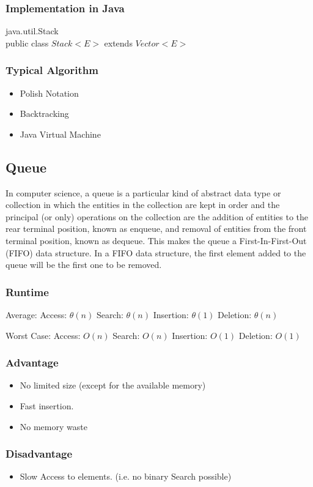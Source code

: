 \documentclass[12pt,a4paper]{article}
\newcommand{\RuntimeHead}{Runtime}
\newcommand{\AdvantageHead}{Advantage}
\newcommand{\DisadvantageHead}{Disadvantage}
\newcommand{\ImplementationInJavaHead}{Implementation in Java}
\newcommand{\TypicalAlgorithmHead}{Typical Algorithm}
\begin{document}
\subsubsection{\ImplementationInJavaHead}
java.util.Stack \\
public class $Stack<E>$
extends $Vector<E>$
\subsubsection{\TypicalAlgorithmHead}
\begin{itemize}
\item Polish Notation
\item Backtracking
\item Java Virtual Machine
\end{itemize}



\subsection{Queue}
In computer science, a queue is a particular kind of abstract data type or collection in which the entities in the collection are kept in order and the principal (or only) operations on the collection are the addition of entities to the rear terminal position, known as enqueue, and removal of entities from the front terminal position, known as dequeue. This makes the queue a First-In-First-Out (FIFO) data structure. In a FIFO data structure, the first element added to the queue will be the first one to be removed.
\subsubsection{\RuntimeHead}
Average: 
Access: $\theta(n)  $
Search: $\theta(n) $
Insertion: $ \theta(1)$ 
Deletion: $\theta (n)$ 

Worst Case: 
Access: $O(n)$  
Search: $O(n) $
Insertion: $O(1)$ 
Deletion: $O(1)$ 

\subsubsection{\AdvantageHead}
\begin{itemize}
\item No limited size (except for the available memory)
\item Fast insertion. 
\item No memory waste
\end{itemize}
\subsubsection{\DisadvantageHead}
\begin{itemize}
\item Slow Access to elements. (i.e. no binary Search possible)
\end{itemize}
\end{document}
